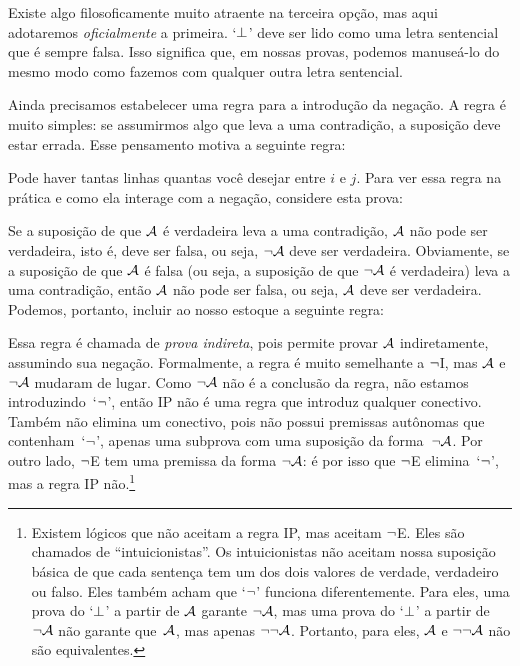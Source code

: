 Existe algo filosoficamente  muito atraente na terceira opção, mas aqui adotaremos \emph{oficialmente} a primeira. `$\bot$'  deve ser lido como uma letra sentencial que é sempre falsa. Isso significa que, em nossas provas, podemos manuseá-lo do mesmo modo como fazemos com qualquer outra letra sentencial.

Ainda precisamos estabelecer uma regra para a introdução da negação. A regra é muito simples: se assumirmos algo que leva a uma contradição, a suposição deve estar errada. Esse pensamento motiva a seguinte regra:

Pode haver tantas linhas quantas você desejar entre $i$ e $j$. Para ver essa regra na prática e como ela interage com a negação, considere esta prova: 
	\begin{fitchproof}
		\open
		\close
	\end{fitchproof}

Se a suposição de que $\mathcal{A}$ é verdadeira leva a uma contradição, $\mathcal{A}$ não pode ser verdadeira, isto é, deve ser falsa, ou seja, $\neg\mathcal{A}$ deve ser verdadeira. Obviamente, se a suposição de que $\mathcal{A}$ é falsa (ou seja, a suposição de que $\neg\mathcal{A}$ é verdadeira)  leva a uma contradição, então $\mathcal{A}$ não pode ser falsa, ou seja, $\mathcal{A}$ deve ser verdadeira. Podemos, portanto, incluir ao nosso estoque a seguinte regra:

Essa regra é chamada de \emph{prova indireta}, pois permite provar $\mathcal{A}$  indiretamente, assumindo sua negação. Formalmente, a regra é muito semelhante a $\neg$I, mas $\mathcal{A}$ e $\neg\mathcal{A}$ mudaram de lugar. Como $\neg\mathcal{A}$ não é a conclusão da regra, não estamos introduzindo~`$\neg$', então  IP não é uma regra que introduz qualquer conectivo. Também não elimina um conectivo, pois não possui premissas autônomas que contenham~`$\neg$', apenas uma subprova com uma suposição da forma~$\neg\mathcal{A}$. Por outro lado, $\neg$E tem uma premissa da forma $\neg\mathcal{A}$: é por isso que $\neg$E elimina~`$\neg$', mas a regra IP não.\footnote{Existem lógicos que não aceitam a regra IP, mas aceitam $\neg$E. Eles são chamados de ``intuicionistas''. Os intuicionistas não aceitam nossa suposição básica de que cada sentença tem um dos dois valores de verdade, verdadeiro ou falso. Eles também acham que  `$\neg$' funciona diferentemente. Para eles, uma prova do `$\bot$' a partir de $\mathcal{A}$ garante $\neg \mathcal{A}$, mas uma prova do `$\bot$' a partir de $\neg\mathcal{A}$ não garante que~$\mathcal{A}$, mas apenas $\neg\neg\mathcal{A}$. Portanto, para eles, $\mathcal{A}$ e $\neg\neg\mathcal{A}$ não são equivalentes.}


